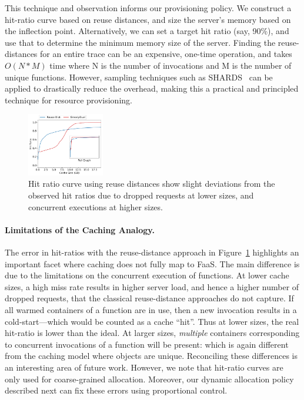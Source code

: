 This technique and observation informs our provisioning policy.
We construct a hit-ratio curve based on reuse distances, and size the server's memory based on the inflection point.
Alternatively, we can set a target hit ratio (say, 90\%), and use that to determine the minimum memory size of the server. 
%
Finding the reuse-distances for an entire trace can be an expensive, one-time operation, and takes $O(N*M)$ time where N is the number of invocations and M is the number of unique functions. 
However, sampling techniques such as SHARDS~\cite{shards} can be applied to drastically reduce the overhead, making this a practical and principled technique for resource provisioning. 



\begin{figure}[t]
  \centering
  \includegraphics[width=0.3\textwidth]{../graphs/rep-funcs-392/hit-ratio-392-b.pdf}
  \caption{Hit ratio curve using reuse distances show slight deviations from the observed hit ratios due to dropped requests at lower sizes, and concurrent executions at higher sizes.}
  \label{fig:hrc}
\end{figure}

\paragraph{Limitations of the Caching Analogy.}
The error in hit-ratios with the reuse-distance approach in Figure~\ref{fig:hrc} highlights an important facet where caching does not fully map to FaaS.
The main difference is due to the limitations on the concurrent execution of functions. 
At lower cache sizes, a high miss rate results in higher server load, and hence a higher number of dropped requests, that the classical reuse-distance approaches do not capture.
If all warmed containers of a function are in use, then a new invocation results in a cold-start---which would be counted as a cache ``hit''.
Thus at lower sizes, the real hit-ratio is lower than the ideal. 
At larger sizes, \emph{multiple} containers corresponding to concurrent invocations of a function will be present: which is again different from the caching model where objects are unique.
Reconciling these differences is an interesting area of future work.
However, we note that hit-ratio curves are only used for coarse-grained allocation.
Moreover, our dynamic allocation policy described next can fix these errors using proportional control. 


